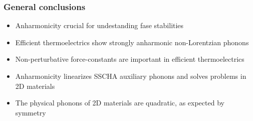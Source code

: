 \documentclass{beamer}
\begin{document}
\begin{frame}

\frametitle{General conclusions}
\begin{itemize}
\item Anharmonicity crucial for undestanding fase stabilities
\item Efficient thermoelectrics show strongly anharmonic non-Lorentzian phonons
\item Non-perturbative force-constants are important in efficient thermoelectrics
\item Anharmonicity linearizes SSCHA auxiliary phonons and solves problems in 2D materials
\item The physical phonons of 2D materials are quadratic, as expected by symmetry
\end{itemize}

\end{frame}

\end{document}

